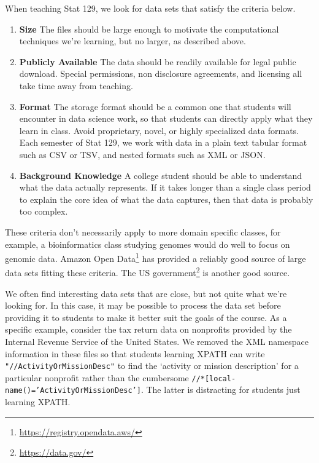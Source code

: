 \documentclass[12pt]{article}
\begin{document}
When teaching Stat 129, we look for data sets that satisfy the criteria below.
\begin{enumerate}
\item \textbf{Size} The files should be large enough to motivate the computational techniques we're learning, but no larger, as described above.
\item \textbf{Publicly Available} The data should be readily available for legal public download.
	Special permissions, non disclosure agreements, and licensing all take time away from teaching.
\item \textbf{Format} The storage format should be a common one that students will encounter in data science work, so that students can directly apply what they learn in class.
	Avoid proprietary, novel, or highly specialized data formats.
    Each semester of Stat 129, we work with data in a plain text tabular format such as CSV or TSV, and nested formats such as XML or JSON.
\item \textbf{Background Knowledge} A college student should be able to understand what the data actually represents.
	If it takes longer than a single class period to explain the core idea of what the data captures, then that data is probably too complex.
\end{enumerate}
These criteria don't necessarily apply to more domain specific classes, for example, a bioinformatics class studying genomes would do well to focus on genomic data.
Amazon Open Data\footnote{\url{https://registry.opendata.aws/}} has provided a reliably good source of large data sets fitting these criteria. 
The US government\footnote{\url{https://data.gov/}} is another good source.

We often find interesting data sets that are close, but not quite what we're looking for.
In this case, it may be possible to process the data set before providing it to students to make it better suit the goals of the course.
As a specific example, consider the tax return data on nonprofits provided by the Internal Revenue Service of the United States\cite{irs990}.
We removed the XML namespace information in these files so that students learning XPATH can write \texttt{"//ActivityOrMissionDesc"} to find the `activity or mission description' for a particular nonprofit rather than the cumbersome \texttt{//*[local-name()='ActivityOrMissionDesc']}.
The latter is distracting for students just learning XPATH.
\end{document}
